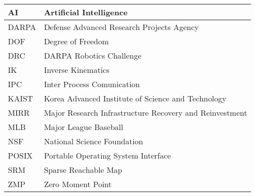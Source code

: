 \begin{tabular}{l | l}
\hline
AI & Artificial Intelligence\\
\hline
DARPA  &  Defense Advanced Research Projects Agency\\
\hline 
DOF & Degree of Freedom \\
\hline
DRC  & DARPA Robotics Challenge \\
\hline
IK & Inverse Kinematics\\ 
\hline
IPC & Inter Process Comunication \\
\hline
KAIST & Korea Advanced Institute of Science and Technology \\
\hline
MIRR & Major Research Infrastructure Recovery and Reinvestment\\
\hline
MLB & Major League Baseball\\
\hline
NSF & National Science Foundation \\
\hline
POSIX & Portable Operating System Interface\\
\hline
SRM & Sparse Reachable Map \\
\hline 
ZMP & Zero Moment Point\\
\hline
\end{tabular}
